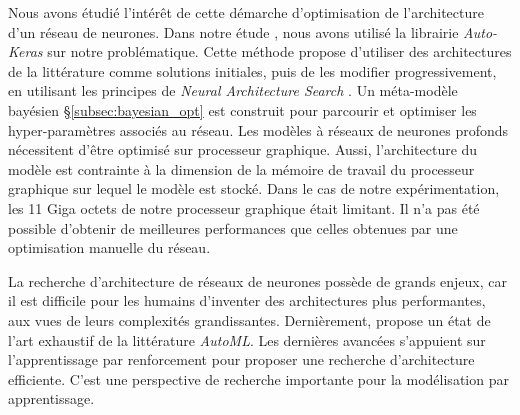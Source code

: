 Nous avons étudié l'intérêt de cette démarche d'optimisation de l'architecture d'un réseau de neurones.
Dans notre étude \cite{nagorny_polarimetric_2019}, nous avons utilisé la librairie \textit{Auto-Keras} \cite{jin_autokeras_2018} sur notre problématique.
Cette méthode propose d'utiliser des architectures de la littérature comme solutions initiales, puis de les modifier progressivement, en utilisant les principes de \textit{Neural Architecture Search} \cite{zoph_neural_2016}.
Un méta-modèle bayésien §\ref{subsec:bayesian_opt} est construit pour parcourir et optimiser les hyper-paramètres associés au réseau.
Les modèles à réseaux de neurones profonds nécessitent d'être optimisé sur processeur graphique.
Aussi, l'architecture du modèle est contrainte à la dimension de la mémoire de travail du processeur graphique sur lequel le modèle est stocké.
Dans le cas de notre expérimentation, les 11 Giga octets de notre processeur graphique était limitant.
Il n'a pas été possible d'obtenir de meilleures performances que celles obtenues par une optimisation manuelle du réseau.

La recherche d'architecture de réseaux de neurones possède de grands enjeux, car il est difficile pour les humains d'inventer des architectures plus performantes, aux vues de leurs complexités grandissantes.
Dernièrement, \cite{elsken_neural_2018} propose un état de l'art exhaustif de la littérature \textit{AutoML}.
Les dernières avancées s'appuient sur l'apprentissage par renforcement pour proposer une recherche d'architecture efficiente.
C'est une perspective de recherche importante pour la modélisation par apprentissage.

